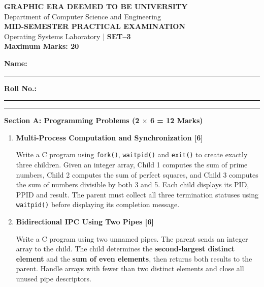 \documentclass[9pt,a4paper]{extarticle}
\begin{document}
\vspace{1cm}
\begin{minipage}[t][0.47\textheight][t]{\textwidth}

\begin{center}
{\large\bfseries GRAPHIC ERA DEEMED TO BE UNIVERSITY}\\[-1mm]
{\small Department of Computer Science and Engineering}\\[-1mm]
{\bfseries MID-SEMESTER PRACTICAL EXAMINATION}\\[-1mm]
{\small Operating Systems Laboratory
\quad | \quad \textbf{SET--3 }}\\[-1mm]
{\small \textbf{Maximum Marks: 20}}
\end{center}

\vspace{-2mm}
\textbf{Name:} \rule{4.2cm}{0.4pt}
\hfill
\textbf{Roll No.:} \rule{3.5cm}{0.4pt}

\vspace{1mm}
\hrule
\vspace{1mm}

\textbf{Section A: Programming Problems (2 $\times$ 6 = 12 Marks)}

\begin{enumerate}[
label=\textbf{P\arabic*.},
leftmargin=6mm,
itemsep=2pt,
topsep=2pt
]

\item \textbf{Multi-Process Computation and Synchronization [6]}

Write a C program using \texttt{fork()}, \texttt{waitpid()} and
\texttt{exit()} to create exactly three children. Given an
integer array, Child 1 computes the sum of prime numbers,
Child 2 computes the sum of perfect squares, and Child 3
computes the sum of numbers divisible by both 3 and 5.
Each child displays its PID, PPID and result. The parent
must collect all three termination statuses using
\texttt{waitpid()} before displaying its completion message.

\item \textbf{Bidirectional IPC Using Two Pipes [6]}

Write a C program using two unnamed pipes. The parent sends
an integer array to the child. The child determines the
\textbf{second-largest distinct element} and the
\textbf{sum of even elements}, then returns both results
to the parent. Handle arrays with fewer than two distinct
elements and close all unused pipe descriptors.

\end{enumerate}


\end{minipage}
\end{document}
